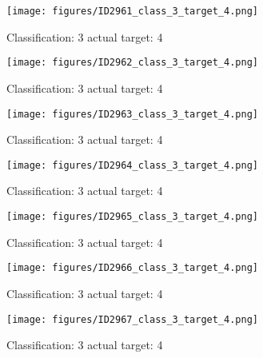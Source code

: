 \begin{figure}[h!]
\begin{center}
\texttt{[image: figures/ID2961\_class\_3\_target\_4.png]}
\end{center}
\caption{ Classification: 3 actual target: 4}
\label{fig:ID2961_class_3_target_4}
\end{figure}
\begin{figure}[h!]
\begin{center}
\texttt{[image: figures/ID2962\_class\_3\_target\_4.png]}
\end{center}
\caption{ Classification: 3 actual target: 4}
\label{fig:ID2962_class_3_target_4}
\end{figure}
\begin{figure}[h!]
\begin{center}
\texttt{[image: figures/ID2963\_class\_3\_target\_4.png]}
\end{center}
\caption{ Classification: 3 actual target: 4}
\label{fig:ID2963_class_3_target_4}
\end{figure}
\begin{figure}[h!]
\begin{center}
\texttt{[image: figures/ID2964\_class\_3\_target\_4.png]}
\end{center}
\caption{ Classification: 3 actual target: 4}
\label{fig:ID2964_class_3_target_4}
\end{figure}
\begin{figure}[h!]
\begin{center}
\texttt{[image: figures/ID2965\_class\_3\_target\_4.png]}
\end{center}
\caption{ Classification: 3 actual target: 4}
\label{fig:ID2965_class_3_target_4}
\end{figure}
\begin{figure}[h!]
\begin{center}
\texttt{[image: figures/ID2966\_class\_3\_target\_4.png]}
\end{center}
\caption{ Classification: 3 actual target: 4}
\label{fig:ID2966_class_3_target_4}
\end{figure}
\begin{figure}[h!]
\begin{center}
\texttt{[image: figures/ID2967\_class\_3\_target\_4.png]}
\end{center}
\caption{ Classification: 3 actual target: 4}
\label{fig:ID2967_class_3_target_4}
\end{figure}
